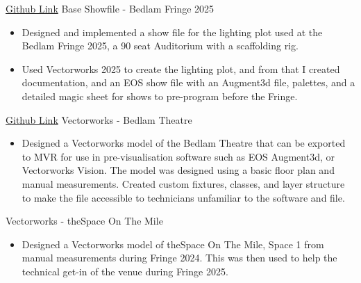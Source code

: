 \documentclass[../CV - Leon Lee - WSP.tex]{subfiles}
\begin{document}
\cvlinkevent
{\href{https://github.com/leon0241/Bedlam-Fringe-Showfile-25}{Github Link}}
{Base Showfile - Bedlam Fringe 2025}
{\begin{itemize}
    \item Designed and implemented a show file for the lighting plot used at the Bedlam Fringe 2025, a 90 seat Auditorium with a scaffolding rig.
    \item Used Vectorworks 2025 to create the lighting plot, and from that I created documentation, and an EOS show file with an Augment3d file, palettes, and a detailed magic sheet for shows to pre-program before the Fringe.
\end{itemize}}

\cvlinkevent
{\href{https://github.com/EdinburghUniversityTheatreCompany/bedlam-vwx}{Github Link}}
{Vectorworks - Bedlam Theatre}
{\begin{itemize}
    \item Designed a Vectorworks model of the Bedlam Theatre that can be exported to MVR for use in pre-visualisation software such as EOS Augment3d, or Vectorworks Vision. The model was designed using a basic floor plan and manual measurements. Created custom fixtures, classes, and layer structure to make the file accessible to technicians unfamiliar to the software and file.
\end{itemize}}

\cvlinkevent
{}
{Vectorworks - theSpace On The Mile}
{\begin{itemize}
    \item Designed a Vectorworks model of theSpace On The Mile, Space 1 from manual measurements during Fringe 2024. This was then used to help the technical get-in of the venue during Fringe 2025.
\end{itemize}}
\end{document}
